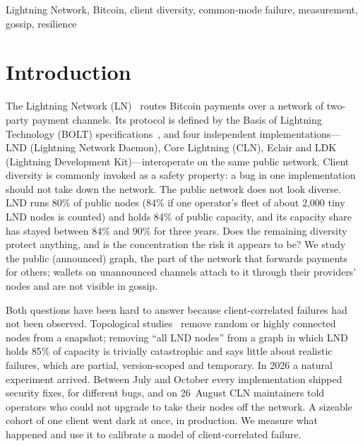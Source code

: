 \documentclass[conference]{IEEEtran}
\begin{document}
\begin{IEEEkeywords}
Lightning Network, Bitcoin, client diversity, common-mode failure, measurement, gossip, resilience
\end{IEEEkeywords}

\section{Introduction}
\label{sec:intro}

The Lightning Network (LN)~\cite{poon2016bitcoin} routes Bitcoin payments over a network of two-party payment
channels. Its protocol is defined by the Basis of Lightning Technology (BOLT)
specifications~\cite{bolt2,bolt3,bolt7,bolt9}, and four independent implementations---LND (Lightning Network
Daemon), Core Lightning (CLN), Eclair and LDK (Lightning Development Kit)---interoperate on the same public
network. Client diversity is commonly invoked as a safety property: a bug in one implementation should not take
down the network. The public network does not look diverse. LND runs 80\% of public nodes (84\% if one operator's
fleet of about 2,000 tiny LND nodes is counted) and holds 84\% of public capacity, and its capacity share has
stayed between 84\% and 90\% for three years. Does the remaining diversity
protect anything, and is the concentration the risk it appears to be? We study the public (announced) graph, the
part of the network that forwards payments for others; wallets on unannounced channels attach to it through their
providers' nodes and are not visible in gossip.

Both questions have been hard to answer because client-correlated failures had not been observed. Topological
studies~\cite{rohrer2019discharged,seres2020topological,lin2020lightning,martinazzi2020evolving,lee2020robustness}
remove random or highly connected nodes from a snapshot; removing ``all LND nodes'' from a graph in which LND holds
85\% of capacity is trivially catastrophic and says little about realistic failures, which are partial,
version-scoped and temporary. In 2026 a natural experiment arrived. Between July and October every implementation
shipped security fixes, for different bugs, and on 26~August CLN maintainers told operators who could not upgrade
to take their nodes off the network. A sizeable cohort of one client went dark at once, in production. We measure
what happened and use it to calibrate a model of client-correlated failure.
\end{document}
